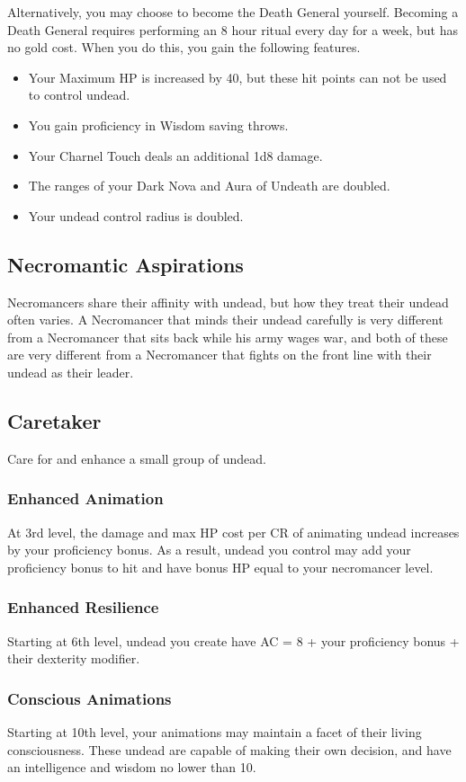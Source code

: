 Alternatively, you may choose to become the Death General yourself. Becoming a Death General requires performing an 8 hour ritual every day for a week, but has no gold cost. When you do this, you gain the following features.

\begin{itemize}
\item Your Maximum HP is increased by 40, but these hit points can not be used to control undead.
\item You gain proficiency in Wisdom saving throws.
\item Your Charnel Touch deals an additional 1d8 damage.
\item The ranges of your Dark Nova and Aura of Undeath are doubled.
\item Your undead control radius is doubled.
\end{itemize}

\subsection{Necromantic Aspirations}
Necromancers share their affinity with undead, but how they treat their undead often varies. A Necromancer that minds their undead carefully is very different from a Necromancer that sits back while his army wages war, and both of these are very different from a Necromancer that fights on the front line with their undead as their leader.

\subsection{Caretaker}
Care for and enhance a small group of undead.

\subsubsection{Enhanced Animation}
At 3rd level, the damage and max HP cost per CR of animating undead increases by your proficiency bonus. As a result, undead you control may add your proficiency bonus to hit and have bonus HP equal to your necromancer level.

\subsubsection{Enhanced Resilience}
Starting at 6th level, undead you create have AC = 8 + your proficiency bonus + their dexterity modifier.

\subsubsection{Conscious Animations}
Starting at 10th level, your animations may maintain a facet of their living consciousness. These undead are capable of making their own decision, and have an intelligence and wisdom no lower than 10.

